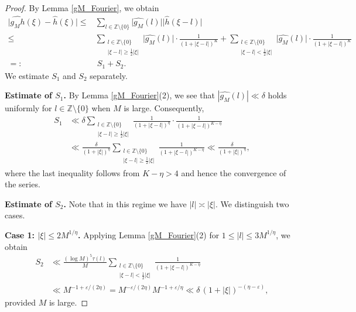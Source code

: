 \documentclass[12pt,a4paper,twoside]{article}
\begin{document}
\begin{proof}
 By  Lemma \ref{gM_Fourier}, we obtain
\begin{align*}
\bigl| \widehat{g_M h}(\xi) - \widehat{h}(\xi) \bigr|
 \le& \sum_{l\in\mathbb{Z}\setminus\{0\}} \bigl| \widehat{g_M}(l)  \bigr| \bigr|\widehat{h}(\xi-l)\bigr|\\
\le&  \sum_{\substack{l\in\mathbb{Z}\setminus\{0\}\\ |\xi-l|\ge \frac{1}{2}|\xi|}} \bigl|\widehat{g_M}(l)  \bigr|\cdot \frac{1}{(1+|\xi-l|)^{K}}+\sum_{\substack{l\in\mathbb{Z}\setminus\{0\}\\ |\xi-l|< \frac{1}{2}|\xi|}} \bigl|\widehat{g_M}(l)  \bigr|\cdot \frac{1}{(1+|\xi-l|)^{K}}\\
=:& ~S_1+S_2.
 \end{align*}
We estimate \(S_1\) and \(S_2\) separately.


\medskip

\noindent\textbf{Estimate of $S_1$.} By Lemma \ref{gM_Fourier}(2), we see that \(|\widehat{g_M}(l)| \ll \delta\) holds uniformly for \(l \in \mathbb{Z} \setminus \{0\}\) when \(M\) is large. Consequently,
\begin{align*}
S_1 &\ll \delta \sum_{\substack{l \in \mathbb{Z}\setminus\{0\} \\ |\xi - l| \ge \frac{1}{2}|\xi|}} \frac{1}{(1 + |\xi - l|)^{\eta}} \cdot \frac{1}{(1 + |\xi - l|)^{K - \eta}} \\
&\ll \frac{\delta}{(1 + |\xi|)^{\eta}} \sum_{\substack{l \in \mathbb{Z}\setminus\{0\} \\ |\xi - l| \ge \frac{1}{2}|\xi|}} \frac{1}{(1 + |\xi - l|)^{K - \eta}}
\ll \frac{\delta}{(1 + |\xi|)^{\eta}},
\end{align*}
where the last inequality follows from \(K - \eta > 4\) and hence the convergence of the series.
\medskip

\noindent\textbf{Estimate of $S_2$.} Note that in this regime we have $|l| \asymp |\xi|$. We distinguish two cases.

\medskip

\noindent\textbf{Case 1: $|\xi| \le 2M^{1/\eta}$.}
Applying Lemma \ref{gM_Fourier}(2) for $1 \le |l| \le 3M^{1/\eta}$, we obtain
\begin{align*}
S_2 &\ll \frac{(\log M)^{5} \tau(l)}{M} \sum_{\substack{l \in \mathbb{Z}\setminus\{0\} \\ |\xi - l| < \frac{1}{2}|\xi|}} \frac{1}{(1 + |\xi - l|)^{K - \eta}} \\
&\ll M^{-1+\varepsilon/(2\eta)} = M^{-\varepsilon/(2\eta)} M^{-1+\varepsilon/\eta} \ll \delta \, (1 + |\xi|)^{-(\eta - \varepsilon)},
\end{align*}
provided $M$ is large.


\end{proof}
\end{document}
